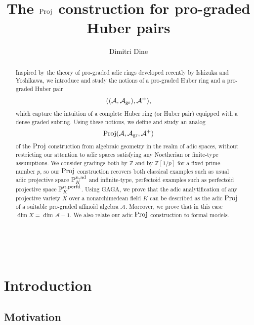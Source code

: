 \documentclass[12pt,twoside,a4paper]{article}
\theoremstyle{definition}
\theoremstyle{remark}
\newcommand\ad{{\rm ad}}
\newcommand\gr{{\rm gr}}
\newcommand\perfd{{\rm perfd}}
\newcommand\Proj{{\rm Proj}}
\begin{document}
 
\title{The $\Proj$ construction for pro-graded Huber pairs}
\author{Dimitri Dine}
\date{}
\maketitle

\begin{abstract}Inspired by the theory of pro-graded adic rings developed recently by Ishizuka and Yoshikawa, we introduce and study the notions of a pro-graded Huber ring and a pro-graded Huber pair \begin{equation*}((\mathcal{A}, \mathcal{A}_{\gr}), \mathcal{A}^{+}),\end{equation*}which capture the intuition of a complete Huber ring (or Huber pair) equipped with a dense graded subring. Using these notions, we define and study an analog \begin{equation*}\Proj(\mathcal{A}, \mathcal{A}_{\gr}, \mathcal{A}^{+})\end{equation*}of the $\Proj$ construction from algebraic geometry in the realm of adic spaces, without restricting our attention to adic spaces satisfying any Noetherian or finite-type assumptions. We consider gradings both by $\mathbb{Z}$ and by $\mathbb{Z}[1/p]$ for a fixed prime number $p$, so our $\Proj$ construction recovers both classical examples such as usual adic projective space $\mathbb{P}_{K}^{n,\ad}$ and infinite-type, perfectoid examples such as perfectoid projective space $\mathbb{P}_{K}^{n,\perfd}$. Using GAGA, we prove that the adic analytification of any projective variety $X$ over a nonarchimedean field $K$ can be described as the adic $\Proj$ of a suitable pro-graded affinoid algebra $\mathcal{A}$. Moreover, we prove that in this case $\dim X=\dim \mathcal{A}-1$. We also relate our adic $\Proj$ construction to formal models. \end{abstract} 

\tableofcontents

\section{Introduction}\label{sec:introduction}

\subsection{Motivation}
\end{document}
